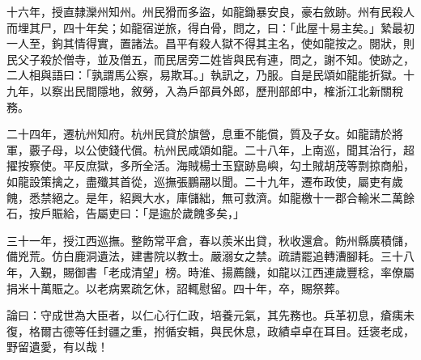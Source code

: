 \begin{pinyinscope}
十六年，授直隸灤州知州。州民猾而多盜，如龍鋤暴安良，豪右斂跡。州有民殺人而埋其尸，四十年矣；如龍宿逆旅，得白骨，問之，曰：「此屋十易主矣。」縶最初一人至，鉤其情得實，置諸法。昌平有殺人獄不得其主名，使如龍按之。閱狀，則民父子殺於僧寺，並及僧五，而民居旁二姓皆與民有連，問之，謝不知。使跡之，二人相與語曰：「孰謂馬公察，易欺耳。」執訊之，乃服。自是民頌如龍能折獄。十九年，以察出民間隱地，敘勞，入為戶部員外郎，歷刑部郎中，榷浙江北新關稅務。

二十四年，遷杭州知府。杭州民貸於旗營，息重不能償，質及子女。如龍請於將軍，覈子母，以公使錢代償。杭州民咸頌如龍。二十八年，上南巡，聞其治行，超擢按察使。平反庶獄，多所全活。海賊楊士玉竄跡島嶼，勾土賊胡茂等剽掠商船，如龍設策擒之，盡殲其首從，巡撫張鵬翮以聞。二十九年，遷布政使，屬吏有歲餽，悉禁絕之。是年，紹興大水，庫儲絀，無可救濟。如龍檄十一郡合輸米二萬餘石，按戶賑給，告屬吏曰：「是逾於歲餽多矣，」

三十一年，授江西巡撫。整飭常平倉，春以羨米出貸，秋收還倉。飭州縣廣積儲，備兇荒。仿白鹿洞遺法，建書院以教士。嚴溺女之禁。疏請罷追轉漕腳耗。三十八年，入覲，賜御書「老成清望」榜。時淮、揚薦饑，如龍以江西連歲豐稔，率僚屬捐米十萬賑之。以老病累疏乞休，詔輒慰留。四十年，卒，賜祭葬。

論曰：守成世為大臣者，以仁心行仁政，培養元氣，其先務也。兵革初息，瘡痍未復，格爾古德等任封疆之重，拊循安輯，與民休息，政績卓卓在耳目。廷褒老成，野留遺愛，有以哉！


\end{pinyinscope}